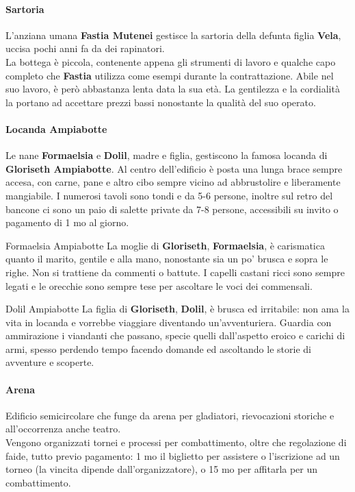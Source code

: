 \documentclass[10pt,twoside,onecolumn,openany]{book}
\begin{document}
\paragraph{Sartoria}
L'anziana umana \textbf{Fastia Mutenei} gestisce la sartoria della defunta figlia \textbf{Vela}, uccisa pochi anni fa da dei rapinatori.\\
La bottega è piccola, contenente appena gli strumenti di lavoro e qualche capo completo che \textbf{Fastia} utilizza come esempi durante la contrattazione. Abile nel suo lavoro, è però abbastanza lenta data la sua età. La gentilezza e la cordialità la portano ad accettare prezzi bassi nonostante la qualità del suo operato.
\newpage
\paragraph{Locanda Ampiabotte}
Le nane \textbf{Formaelsia} e \textbf{Dolil}, madre e figlia, gestiscono la famosa locanda di \textbf{Gloriseth Ampiabotte}. Al centro dell'edificio è posta una lunga brace sempre accesa, con carne, pane e altro cibo sempre vicino ad abbrustolire e liberamente mangiabile. I numerosi tavoli sono tondi e da 5-6 persone, inoltre sul retro del bancone ci sono un paio di salette private da 7-8 persone, accessibili su invito o pagamento di 1 mo al giorno.
\begin{multicols}{2}
\begin{paperbox}{{Formaelsia Ampiabotte}}
La moglie di \textbf{Gloriseth}, \textbf{Formaelsia}, è carismatica quanto il marito, gentile e alla mano, nonostante sia un po' brusca e sopra le righe. Non si trattiene da commenti o battute. I capelli castani ricci sono sempre legati e le orecchie sono sempre tese per ascoltare le voci dei commensali.
\end{paperbox}
\columnbreak
\begin{paperbox}{{Dolil Ampiabotte}}
La figlia di \textbf{Gloriseth}, \textbf{Dolil}, è brusca ed irritabile: non ama la vita in locanda e vorrebbe viaggiare diventando un'avventuriera. Guardia con ammirazione i viandanti che passano, specie quelli dall'aspetto eroico e carichi di armi, spesso perdendo tempo facendo domande ed ascoltando le storie di avventure e scoperte.
\end{paperbox}
\end{multicols}
\paragraph{Arena}
Edificio semicircolare che funge da arena per gladiatori, rievocazioni storiche e all'occorrenza anche teatro.\\
Vengono organizzati tornei e processi per combattimento, oltre che regolazione di faide, tutto previo pagamento: 1 mo il biglietto per assistere o l'iscrizione ad un torneo (la vincita dipende dall'organizzatore), o 15 mo per affitarla per un combattimento.
\end{document}
